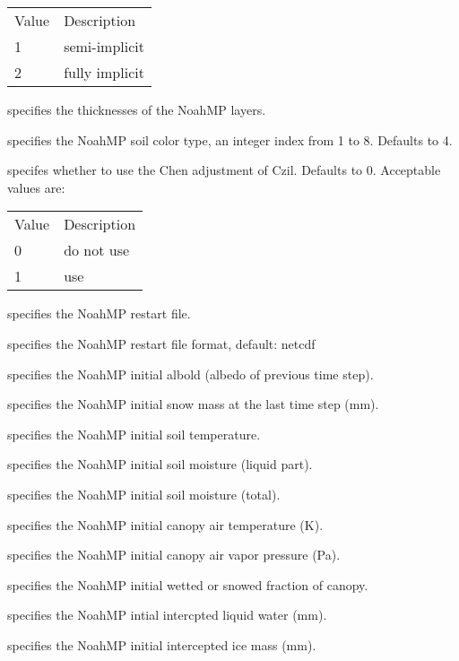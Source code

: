  \begin{tabular}{ll}
 Value & Description    \\
  1    & semi-implicit  \\
  2    & fully implicit \\
 \end{tabular}

  specifies the thicknesses of the NoahMP layers.

  specifies the NoahMP soil color type,
 an integer index from 1 to 8.  Defaults to 4.

  specifes whether to use the Chen adjustment
 of Czil.  Defaults to 0.
 Acceptable values are:

 \begin{tabular} {ll}
 Value & Description \\
  0    & do not use  \\
  1    & use         \\
 \end{tabular}

  specifies the NoahMP restart file.

  specifies the NoahMP restart file
 format, default: netcdf

  specifies the NoahMP initial albold
 (albedo of previous time step).

  specifies the NoahMP initial snow mass
 at the last time step (mm).

  specifies the NoahMP initial soil
 temperature.

  specifies the NoahMP initial soil
 moisture (liquid part).

  specifies the NoahMP initial soil
 moisture (total).

  specifies the NoahMP initial canopy air
 temperature (K).

  specifies the NoahMP initial canopy air
 vapor pressure (Pa).

  specifies the NoahMP initial wetted or
 snowed fraction of canopy.

  specifies the NoahMP intial intercpted
 liquid water (mm).

  specifies the NoahMP initial intercepted
 ice mass (mm).

